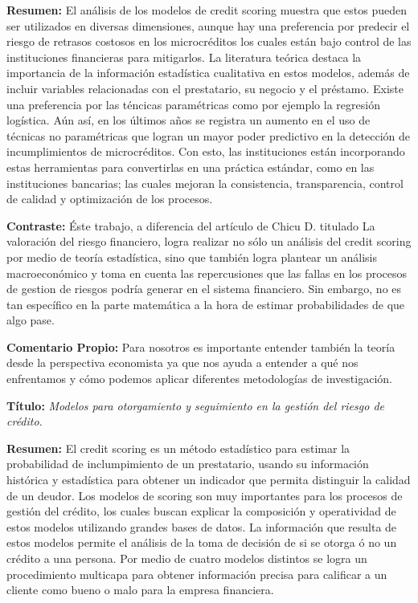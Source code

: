 \documentclass[
  letterpaper,
  DIV=11,
  numbers=noendperiod]{scrreprt}
\begin{document}
\textbf{Resumen:} El análisis de los modelos de credit scoring muestra
que estos pueden ser utilizados en diversas dimensiones, aunque hay una
preferencia por predecir el riesgo de retrasos costosos en los
microcréditos los cuales están bajo control de las instituciones
financieras para mitigarlos. La literatura teórica destaca la
importancia de la información estadística cualitativa en estos modelos,
además de incluir variables relacionadas con el prestatario, su negocio
y el préstamo. Existe una preferencia por las téncicas paramétricas como
por ejemplo la regresión logística. Aún así, en los últimos años se
registra un aumento en el uso de técnicas no paramétricas que logran un
mayor poder predictivo en la detección de incumplimientos de
microcréditos. Con esto, las instituciones están incorporando estas
herramientas para convertirlas en una práctica estándar, como en las
instituciones bancarias; las cuales mejoran la consistencia,
transparencia, control de calidad y optimización de los procesos.

\textbf{Contraste:} Éste trabajo, a diferencia del artículo de Chicu D.
titulado La valoración del riesgo financiero, logra realizar no sólo un
análisis del credit scoring por medio de teoría estadística, sino que
también logra plantear un análisis macroeconómico y toma en cuenta las
repercusiones que las fallas en los procesos de gestion de riesgos
podría generar en el sistema financiero. Sin embargo, no es tan
específico en la parte matemática a la hora de estimar probabilidades de
que algo pase.

\textbf{Comentario Propio:} Para nosotros es importante entender también
la teoría desde la perspectiva economista ya que nos ayuda a entender a
qué nos enfrentamos y cómo podemos aplicar diferentes metodologías de
investigación.

\textbf{Título:} \emph{Modelos para otorgamiento y seguimiento en la
gestión del riesgo de crédito.}

\textbf{Resumen:} El credit scoring es un método estadístico para
estimar la probabilidad de inclumpimiento de un prestatario, usando su
información histórica y estadística para obtener un indicador que
permita distinguir la calidad de un deudor. Los modelos de scoring son
muy importantes para los procesos de gestión del crédito, los cuales
buscan explicar la composición y operatividad de estos modelos
utilizando grandes bases de datos. La información que resulta de estos
modelos permite el análisis de la toma de decisión de si se otorga ó no
un crédito a una persona. Por medio de cuatro modelos distintos se logra
un procedimiento multicapa para obtener información precisa para
calificar a un cliente como bueno o malo para la empresa financiera.
\end{document}
